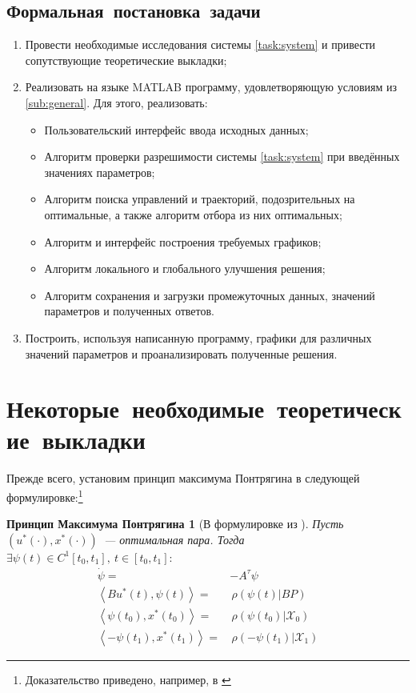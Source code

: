 \documentclass[11pt, oneside, final]{article}
\theoremstyle{break}
\newtheorem*{PMP}{Принцип Максимума Понтрягина}
\numberwithin{equation}{section}
\theoremstyle{plain}
\theoremstyle{definition}
\newcommand{\scalar}[2]{\left< #1, #2\right>}
\begin{document}
    \subsection{Формальная~постановка~задачи} 
    \label{sub:formal}
    \begin{enumerate}
        \item Провести необходимые исследования системы \eqref{task:system} и привести сопутствующие теоретические выкладки;
        \item Реализовать на языке MATLAB программу, удовлетворяющую условиям из \ref{sub:general}. Для этого, реализовать:
        \begin{itemize}
            \item  Пользовательский интерфейс ввода исходных данных;
            \item  Алгоритм проверки разрешимости системы \eqref{task:system} при введённых значениях параметров;
            \item  Алгоритм поиска управлений и траекторий, подозрительных на оптимальные, а также алгоритм отбора из них оптимальных;
            \item  Алгоритм и интерфейс построения требуемых графиков;
            \item  Алгоритм локального и глобального улучшения решения; 
            \item  Алгоритм сохранения и загрузки промежуточных данных, значений параметров и полученных ответов.
        \end{itemize}
        \item Построить, используя написанную программу, графики для различных значений параметров и проанализировать полученные решения.
    \end{enumerate}
    \pagebreak
    \section{Некоторые~необходимые~теоретические~выкладки}
    \label{sec:theory}
    Прежде всего, установим принцип максимума Понтрягина в следующей формулировке:\footnote{Доказательство приведено, например, в \cite{Pontr'yaginEtAl:maximum}}
    \begin{PMP}[В формулировке из \cite{RoublevTochilin:matlab}]
        \label{th:max}
        Пусть \((u^{*}(\cdot), x^{*}(\cdot))\)~--- оптимальная пара. Тогда \(\exists \psi(t) \in C^1[t_0, t_1],\: t \in [t_0, t_1]\!: \)
        \begin{align}
            \dot \psi =& -\!A^{\tau}\psi \label{eq:conj} \\
            \scalar{Bu^{*}(t)}{\psi(t)} =& \, \rho(\psi(t)|BP) \label{eq:optimum} \\ 
            \scalar{\psi(t_0)}{x^{*}(t_0)} =& \, \rho(\psi(t_0)|\mathcal{X}_0) \label{eq:trans:1} \\
            \scalar{-\psi(t_1)}{x^{*}(t_1)} =& \, \rho(-\psi(t_1)|\mathcal{X}_1) \label{eq:trans:2}            
        \end{align}
    \end{PMP}
\end{document}
